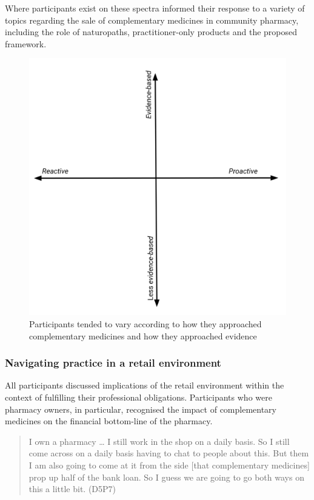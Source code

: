 \documentclass[11pt,a4paper]{article}
\begin{document}
Where participants exist on these spectra informed their response to a
variety of topics regarding the sale of complementary medicines in
community pharmacy, including the role of naturopaths, practitioner-only
products and the proposed framework.

\begin{figure}
\centering
\includegraphics{files/CMEthics_context3.png}
\caption{Participants tended to vary according to how they approached
complementary medicines and how they approached evidence}
\end{figure}

\subsubsection{Navigating practice in a retail
environment}\label{navigating-practice-in-a-retail-environment}

All participants discussed implications of the retail environment within
the context of fulfilling their professional obligations. Participants
who were pharmacy owners, in particular, recognised the impact of
complementary medicines on the financial bottom-line of the pharmacy.

\begin{quote}
I own a pharmacy \ldots{} I still work in the shop on a daily basis. So
I still come across on a daily basis having to chat to people about
this. But them I am also going to come at it from the side {[}that
complementary medicines{]} prop up half of the bank loan. So I guess we
are going to go both ways on this a little bit. (D5P7)
\end{quote}
\end{document}
